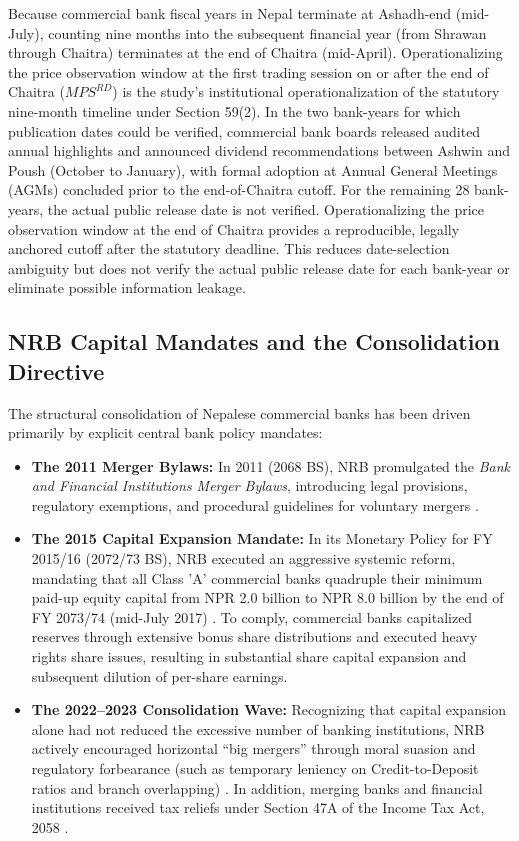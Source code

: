 Because commercial bank fiscal years in Nepal terminate at Ashadh-end (mid-July), counting nine months into the subsequent financial year (from Shrawan through Chaitra) terminates at the end of Chaitra (mid-April). Operationalizing the price observation window at the first trading session on or after the end of Chaitra ($\mathit{MPS}^{RD}$) is the study's institutional operationalization of the statutory nine-month timeline under Section 59(2). In the two bank-years for which publication dates could be verified, commercial bank boards released audited annual highlights and announced dividend recommendations between Ashwin and Poush (October to January), with formal adoption at Annual General Meetings (AGMs) concluded prior to the end-of-Chaitra cutoff. For the remaining 28 bank-years, the actual public release date is not verified. Operationalizing the price observation window at the end of Chaitra provides a reproducible, legally anchored cutoff after the statutory deadline. This reduces date-selection ambiguity but does not verify the actual public release date for each bank-year or eliminate possible information leakage.

\subsection{NRB Capital Mandates and the Consolidation Directive}
\label{subsec:nrb_consolidation}

The structural consolidation of Nepalese commercial banks has been driven primarily by explicit central bank policy mandates:
\begin{itemize}
\item \textbf{The 2011 Merger Bylaws:} In 2011 (2068 BS), NRB promulgated the \textit{Bank and Financial Institutions Merger Bylaws}, introducing legal provisions, regulatory exemptions, and procedural guidelines for voluntary mergers \citep{nrb2011}.
\item \textbf{The 2015 Capital Expansion Mandate:} In its Monetary Policy for FY 2015/16 (2072/73 BS), NRB executed an aggressive systemic reform, mandating that all Class 'A' commercial banks quadruple their minimum paid-up equity capital from NPR 2.0 billion to NPR 8.0 billion by the end of FY 2073/74 (mid-July 2017) \citep{nrb2015}. To comply, commercial banks capitalized reserves through extensive bonus share distributions and executed heavy rights share issues, resulting in substantial share capital expansion and subsequent dilution of per-share earnings.
\item \textbf{The 2022--2023 Consolidation Wave:} Recognizing that capital expansion alone had not reduced the excessive number of banking institutions, NRB actively encouraged horizontal ``big mergers'' through moral suasion and regulatory forbearance (such as temporary leniency on Credit-to-Deposit ratios and branch overlapping) \citep{tht2023nrbmerger}. In addition, merging banks and financial institutions received tax reliefs under Section 47A of the Income Tax Act, 2058 \citep{incometaxact2058}.
\end{itemize}

